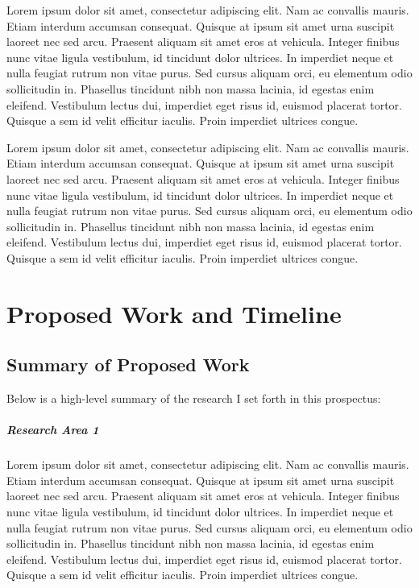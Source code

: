 \documentclass[oneside]{memoir}
\begin{document}
Lorem ipsum dolor sit amet, consectetur adipiscing elit. Nam ac convallis mauris. Etiam interdum accumsan consequat. Quisque at ipsum sit amet urna suscipit laoreet nec sed arcu. Praesent aliquam sit amet eros at vehicula. Integer finibus nunc vitae ligula vestibulum, id tincidunt dolor ultrices. In imperdiet neque et nulla feugiat rutrum non vitae purus. Sed cursus aliquam orci, eu elementum odio sollicitudin in. Phasellus tincidunt nibh non massa lacinia, id egestas enim eleifend. Vestibulum lectus dui, imperdiet eget risus id, euismod placerat tortor. Quisque a sem id velit efficitur iaculis. Proin imperdiet ultrices congue.

Lorem ipsum dolor sit amet, consectetur adipiscing elit. Nam ac convallis mauris. Etiam interdum accumsan consequat. Quisque at ipsum sit amet urna suscipit laoreet nec sed arcu. Praesent aliquam sit amet eros at vehicula. Integer finibus nunc vitae ligula vestibulum, id tincidunt dolor ultrices. In imperdiet neque et nulla feugiat rutrum non vitae purus. Sed cursus aliquam orci, eu elementum odio sollicitudin in. Phasellus tincidunt nibh non massa lacinia, id egestas enim eleifend. Vestibulum lectus dui, imperdiet eget risus id, euismod placerat tortor. Quisque a sem id velit efficitur iaculis. Proin imperdiet ultrices congue.

%
%

\chapter{Proposed Work and Timeline}
\label{ch:summary}

\section{Summary of Proposed Work}

Below is a high-level summary of the research I set forth in this prospectus:

\paragraph{Research Area 1} 
Lorem ipsum dolor sit amet, consectetur adipiscing elit. Nam ac convallis mauris. Etiam interdum accumsan consequat. Quisque at ipsum sit amet urna suscipit laoreet nec sed arcu. Praesent aliquam sit amet eros at vehicula. Integer finibus nunc vitae ligula vestibulum, id tincidunt dolor ultrices. In imperdiet neque et nulla feugiat rutrum non vitae purus. Sed cursus aliquam orci, eu elementum odio sollicitudin in. Phasellus tincidunt nibh non massa lacinia, id egestas enim eleifend. Vestibulum lectus dui, imperdiet eget risus id, euismod placerat tortor. Quisque a sem id velit efficitur iaculis. Proin imperdiet ultrices congue.
\end{document}
